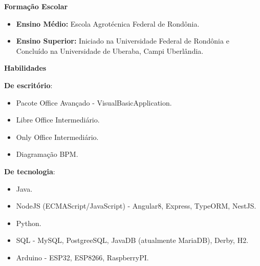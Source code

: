 \documentclass[12pt,a4paper,oneside,sumario=tradicional,brazil]{abntex2}
\begin{document}
\begin{center}
	\textbf{{\Large Formação Escolar}} \\
\end{center}
\begin{itemize}
	\item \textbf{Ensino Médio:} Escola Agrotécnica Federal de Rondônia. \\
	\vspace{-1cm}
	\item \textbf{Ensino Superior:} Iniciado na Universidade Federal de Rondônia e Concluído na Universidade de Uberaba, Campi Uberlândia. \\
\end{itemize}

\begin{center}
	\textbf{{\Large Habilidades}} \\
\end{center}
	\textbf{De escritório}: \\
	\vspace{-1cm}
\begin{itemize}
	\item Pacote Office Avançado - VisualBasicApplication. \\
	\vspace{-1cm}
	\item Libre Office Intermediário. \\
	\vspace{-1cm}
	\item Only Office Intermediário. \\
	\vspace{-1cm}
	\item Diagramação BPM. \\
\end{itemize}
	\textbf{De tecnologia}: \\
	\vspace{-1cm}
\begin{itemize}
	\item Java. \\
	\vspace{-1cm}
	\item NodeJS (ECMAScript/JavaScript) - Angular8, Express, TypeORM, NestJS. \\
	\vspace{-1cm}
	\item Python. \\
	\vspace{-1cm}
	\item SQL - MySQL, PostgreeSQL, JavaDB (atualmente MariaDB), Derby, H2. \\
	\vspace{-1cm}
	\item Arduino - ESP32, ESP8266, RaspberryPI. \\
\end{itemize}
\end{document}
